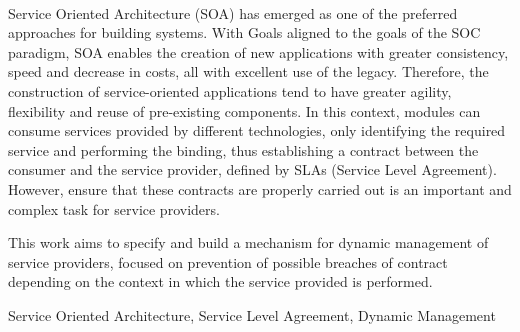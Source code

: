 \paragraph{}
Service Oriented Architecture (SOA) has emerged as one of the preferred approaches for building systems.
With Goals aligned to the goals of the SOC paradigm, SOA enables the creation of new applications with greater consistency, speed and decrease in costs, all with excellent use of the legacy. Therefore, the construction of service-oriented applications tend to have greater agility, flexibility and reuse of pre-existing components. 
In this context, modules can consume services provided by different technologies, only identifying the required service and performing the binding, thus establishing a contract between the consumer and the service provider, defined by SLAs (Service Level Agreement). However, ensure that these contracts are properly carried out is an important and complex task for service providers.

This work aims to specify and build a mechanism for dynamic management of service providers, focused on prevention of possible breaches of contract depending on the context in which the service provided is performed.


\begin{keywords}
Service Oriented Architecture, Service Level Agreement, Dynamic Management
\end{keywords}
